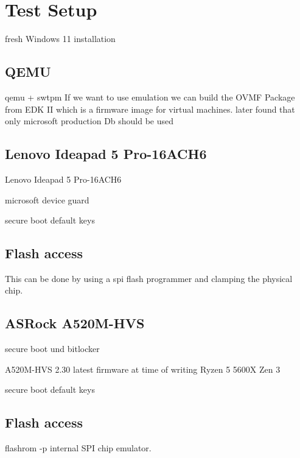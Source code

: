 
\chapter{Test Setup}
\label{sec:test-setup}

fresh Windows 11 installation

\section{\ac{QEMU}}
\label{sec:test-setup:qemu}

qemu + swtpm
If we want to use emulation we can build the \ac{OVMF} Package from EDK II which is a firmware image for virtual machines.
later found that only microsoft production Db should be used

\section{Lenovo Ideapad 5 Pro-16ACH6}
\label{sec:test-setup:lenovo}

Lenovo Ideapad 5 Pro-16ACH6


microsoft device guard

secure boot default keys

\section{Flash access}

This can be done by using a spi flash programmer and clamping the physical chip. 

\section{ASRock A520M-HVS}
\label{sec:test-setup:asrock}



secure boot und bitlocker


A520M-HVS 2.30 latest firmware at time of writing
Ryzen 5 5600X Zen 3

secure boot default keys

\section{Flash access}

flashrom -p internal
SPI chip emulator. 
